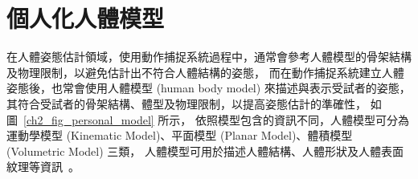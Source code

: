 
\clearpage

\section{個人化人體模型}
在人體姿態估計領域，使用動作捕捉系統過程中，通常會參考人體模型的骨架結構及物理限制，以避免估計出不符合人體結構的姿態，
而在動作捕捉系統建立人體姿態後，也常會使用人體模型 (human body model) 來描述與表示受試者的姿態，
其符合受試者的骨架結構、體型及物理限制，以提高姿態估計的準確性，
如圖~\ref{ch2_fig_personal_model} 所示，
依照模型包含的資訊不同，人體模型可分為運動學模型 (Kinematic Model)、平面模型 (Planar Model)、體積模型 (Volumetric Model) 三類，
人體模型可用於描述人體結構、人體形狀及人體表面紋理等資訊~\cite{gong2016human}。

